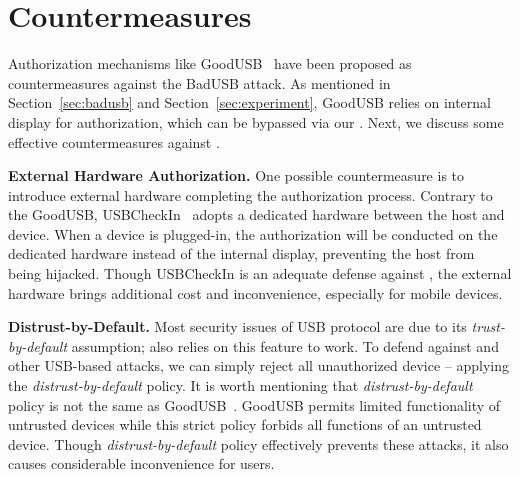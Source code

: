 \section{Countermeasures}
\label{sec:countermeasures}

Authorization mechanisms like GoodUSB~\cite{tian2015defending} have been
proposed as countermeasures against the BadUSB attack. As mentioned in
Section~\ref{sec:badusb} and Section~\ref{sec:experiment}, GoodUSB relies on
internal display for authorization, which can be bypassed via our \tool. 
Next, we discuss some effective countermeasures against \tool.

\textbf{External Hardware Authorization.} One possible countermeasure is to
introduce external hardware completing the authorization process. Contrary to
the GoodUSB, USBCheckIn~\cite{usbcheckin} adopts a dedicated hardware between
the host and device. When a device is plugged-in, the authorization will be
conducted on the dedicated hardware instead of the internal display, preventing
the host from being hijacked. Though USBCheckIn is an adequate defense against
\tool, the external hardware brings additional cost and inconvenience,
especially for mobile devices.

\textbf{Distrust-by-Default.} Most security issues of USB protocol are due to
its \textit{trust-by-default} assumption; \tool also relies on this feature to work.
To defend against \tool and other USB-based attacks, we can simply reject all
{unauthorized} device -- applying the \textit{distrust-by-default} policy.  It
is worth mentioning that \textit{distrust-by-default} policy is not the same as
GoodUSB~\cite{tian2015defending}.   GoodUSB permits limited functionality of untrusted devices while this strict policy forbids all functions of an untrusted device. Though \textit{distrust-by-default} policy effectively
prevents these attacks, it also causes considerable inconvenience for users.

